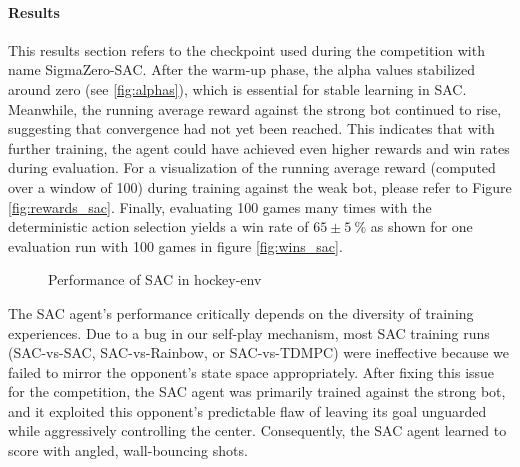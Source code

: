 \paragraph{Results}
This results section refers to the checkpoint used during the competition with name SigmaZero-SAC. After the warm-up phase, the alpha values stabilized around zero (see \ref{fig:alphas}), which is essential for stable learning in SAC. Meanwhile, the running average reward against the strong bot continued to rise, suggesting that convergence had not yet been reached. This indicates that with further training, the agent could have achieved even higher rewards and win rates during evaluation. For a visualization of the running average reward (computed over a window of 100) during training against the weak bot, please refer to Figure \ref{fig:rewards_sac}. Finally, evaluating 100 games many times with the deterministic action selection yields a win rate of $65\pm5 \ \%$ as shown for one evaluation run with 100 games in figure \ref{fig:wins_sac}.
\begin{figure}[htbp]
    \centering
    \hspace{0.5cm} %
    \caption{Performance of SAC in hockey-env}
    \label{fig:SAC-perf}
\end{figure}
The SAC agent's performance critically depends on the diversity of training experiences. Due to a bug in our self-play mechanism, most SAC training runs (SAC-vs-SAC, SAC-vs-Rainbow, or SAC-vs-TDMPC) were ineffective because we failed to mirror the opponent’s state space appropriately. After fixing this issue for the competition, the SAC agent was primarily trained against the strong bot, and it exploited this opponent’s predictable flaw of leaving its goal unguarded while aggressively controlling the center. Consequently, the SAC agent learned to score with angled, wall-bouncing shots.

